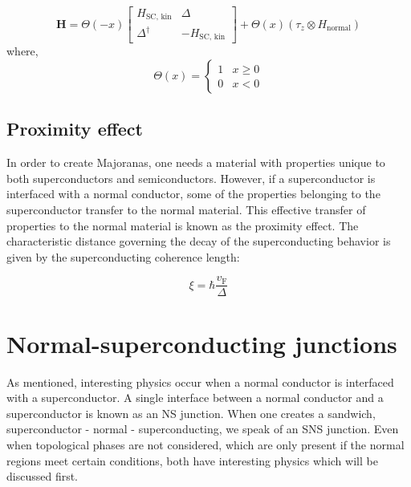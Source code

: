         \begin{equation}
            \mathbf{H} =  \Theta \left(-x\right) \begin{bmatrix} H_\text{SC, kin} & \Delta \\ \Delta^\dagger & -H_\text{SC, kin} \end{bmatrix} + \Theta \left(x\right)  \left( \tau_z \otimes H_\text{normal} \right) 
            \end{equation}
        where, 
        \begin{equation}
            \Theta(x) = \begin{cases} 1 & x \geq 0 \\ 0 & x < 0 \end{cases}
        \end{equation}


    \subsection{Proximity effect}
        In order to create Majoranas, one needs a material with properties unique to both superconductors and semiconductors.
        However, if a superconductor is interfaced with a normal conductor, some of the properties belonging to the superconductor transfer to the normal material.
        This effective transfer of properties to the normal material is known as the proximity effect.
        The characteristic distance governing the decay of the superconducting behavior is given by the superconducting coherence length:
        
        \begin{equation}
            \xi = \hbar \frac{v_\text{F}}{\Delta}
            \label{eq:theory_sc_coherence_length}
        \end{equation}

\section{Normal-superconducting junctions}
    As mentioned, interesting physics occur when a normal conductor is interfaced with a superconductor.
    A single interface between a normal conductor and a superconductor is known as an NS junction.
    When one creates a sandwich, superconductor - normal - superconducting, we speak of an SNS junction.
    Even when topological phases are not considered, which are only present if the normal regions meet certain conditions, both have interesting physics which will be discussed first.


